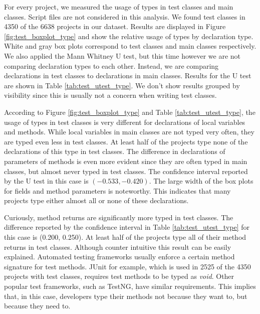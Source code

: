 \documentclass[preprint]{sigplanconf}
\begin{document}
For every project, we measured the usage of types in test classes and main classes.
Script files are not considered in this analysis.
We found test classes in 4350 of the 6638 projects in our dataset.
Results are displayed in Figure \ref{fig:test_boxplot_type} and show the relative usage of types by declaration type.
White and gray box plots correspond to test classes and main classes respectively.
We also applied the Mann Whitney U test, but this time however we are not comparing declaration types to each other.
Instead, we are comparing declarations in test classes to declarations in main classes.
Results for the U test are shown in Table \ref{tab:test_utest_type}.
We don't show results grouped by visibility since this is usually not a concern when writing test classes.

According to Figure \ref{fig:test_boxplot_type} and Table \ref{tab:test_utest_type}, the usage of types in test classes is very different for declarations of local variables and methods.
While local variables in main classes are not typed very often, they are typed even less in test classes.
At least half of the projects type none of the declarations of this type in test classes.
The difference in declarations of parameters of methods is even more evident since they are often typed in main classes, but almost never typed in test classes.
The confidence interval reported by the U test in this case is $(-0.533, -0.420)$.
The large width of the box plots for fields and method parameters is noteworthy.
This indicates that many projects type either almost all or none of these declarations.

Curiously, method returns are significantly more typed in test classes.
The difference reported by the confidence interval in Table \ref{tab:test_utest_type} for this case is (0.200, 0.250).
At least half of the projects type all of their method returns in test classes.
Although counter intuitive this result can be easily explained.
Automated testing frameworks usually enforce a certain method signature for test methods.
JUnit for example, which is used in 2525 of the 4350 projects with test classes, requires test methods to be typed as \emph{void}.
Other popular test frameworks, such as TestNG, have similar requirements.
This implies that, in this case, developers type their methods not because they want to, but because they need to.
\end{document}
